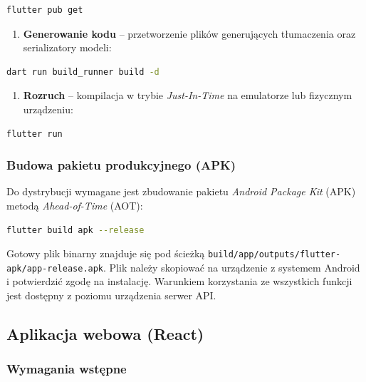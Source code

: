\documentclass[12pt,a4paper]{article}
\begin{document}
\begin{lstlisting}[language=bash, numbers=none]
flutter pub get
\end{lstlisting}

\begin{enumerate}[leftmargin=1.6cm, start=3]
    \item \textbf{Generowanie kodu} -- przetworzenie plik\'ow generuj\k{a}cych t\l{}umaczenia oraz serializatory modeli:
\end{enumerate}

\begin{lstlisting}[language=bash, numbers=none]
dart run build_runner build -d
\end{lstlisting}

\begin{enumerate}[leftmargin=1.6cm, start=4]
    \item \textbf{Rozruch} -- kompilacja w trybie \textit{Just-In-Time} na emulatorze lub fizycznym urz\k{a}dzeniu:
\end{enumerate}

\begin{lstlisting}[language=bash, numbers=none]
flutter run
\end{lstlisting}

\subsubsection{Budowa pakietu produkcyjnego (APK)}

Do dystrybucji wymagane jest zbudowanie pakietu \textit{Android Package Kit} (APK) metod\k{a} \textit{Ahead-of-Time} (AOT):

\begin{lstlisting}[language=bash, numbers=none]
flutter build apk --release
\end{lstlisting}

Gotowy plik binarny znajduje si\k{e} pod \'scie\.zk\k{a} \texttt{build/\allowbreak{}app/\allowbreak{}outputs/\allowbreak{}flutter-apk/\allowbreak{}app-release.\allowbreak{}apk}. Plik nale\.zy skopiowa\'c na urz\k{a}dzenie z systemem Android i potwierdzi\'c zgod\k{e} na instalacj\k{e}. Warunkiem korzystania ze wszystkich funkcji jest dost\k{e}pny z poziomu urz\k{a}dzenia serwer API.

\subsection{Aplikacja webowa (React)}

\subsubsection{Wymagania wst\k{e}pne}
\end{document}
